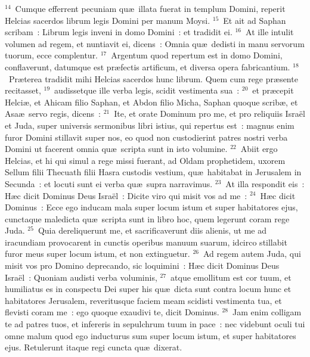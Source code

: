 ${}^{14}$~Cumque efferrent pecuniam qu\ae\ illata fuerat in templum Domini, reperit Helcias sacerdos librum legis Domini per manum Moysi.
${}^{15}$~Et ait ad Saphan scribam~: Librum legis inveni in domo Domini~: et tradidit ei.
${}^{16}$~At ille intulit volumen ad regem, et nuntiavit ei, dicens~: Omnia qu\ae\ dedisti in manu servorum tuorum, ecce complentur.
${}^{17}$~Argentum quod repertum est in domo Domini, conflaverunt, datumque est pr\ae fectis artificum, et diversa opera fabricantium.
${}^{18}$~Pr\ae terea tradidit mihi Helcias sacerdos hunc librum. Quem cum rege pr\ae sente recitasset,
${}^{19}$~audissetque ille verba legis, scidit vestimenta sua~:
${}^{20}$~et pr\ae cepit Helci\ae , et Ahicam filio Saphan, et Abdon filio Micha, Saphan quoque scrib\ae , et Asa\ae\ servo regis, dicens~:
${}^{21}$~Ite, et orate Dominum pro me, et pro reliquiis Isra\"el et Juda, super universis sermonibus libri istius, qui repertus est~: magnus enim furor Domini stillavit super nos, eo quod non custodierint patres nostri verba Domini ut facerent omnia qu\ae\ scripta sunt in isto volumine.
${}^{22}$~Abiit ergo Helcias, et hi qui simul a rege missi fuerant, ad Oldam prophetidem, uxorem Sellum filii Thecuath filii Hasra custodis vestium, qu\ae\ habitabat in Jerusalem in Secunda~: et locuti sunt ei verba qu\ae\ supra narravimus.
${}^{23}$~At illa respondit eis~: H\ae c dicit Dominus Deus Isra\"el~: Dicite viro qui misit vos ad me~:
${}^{24}$~H\ae c dicit Dominus~: Ecce ego inducam mala super locum istum et super habitatores ejus, cunctaque maledicta qu\ae\ scripta sunt in libro hoc, quem legerunt coram rege Juda.
${}^{25}$~Quia dereliquerunt me, et sacrificaverunt diis alienis, ut me ad iracundiam provocarent in cunctis operibus manuum suarum, idcirco stillabit furor meus super locum istum, et non extinguetur.
${}^{26}$~Ad regem autem Juda, qui misit vos pro Domino deprecando, sic loquimini~: H\ae c dicit Dominus Deus Isra\"el~: Quoniam audisti verba voluminis,
${}^{27}$~atque emollitum est cor tuum, et humiliatus es in conspectu Dei super his qu\ae\ dicta sunt contra locum hunc et habitatores Jerusalem, reveritusque faciem meam scidisti vestimenta tua, et flevisti coram me~: ego quoque exaudivi te, dicit Dominus.
${}^{28}$~Jam enim colligam te ad patres tuos, et infereris in sepulchrum tuum in pace~: nec videbunt oculi tui omne malum quod ego inducturus sum super locum istum, et super habitatores ejus. Retulerunt itaque regi cuncta qu\ae\ dixerat.


